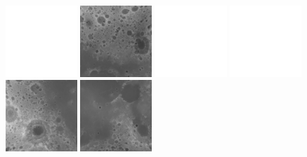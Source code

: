 \documentclass[oneside,10pt]{memoir}
\begin{document}
\begin{Spacing}{1.1}
\begin{figure}
  \centering
  \includegraphics[width=0.24\textwidth]{fig/blank.pdf}
  \includegraphics[width=0.24\textwidth]{fig/dtmh2.png}
  \includegraphics[width=0.24\textwidth]{fig/blank.pdf}
  \includegraphics[width=0.24\textwidth]{fig/blank.pdf}\\\vspace{1pt}
  \includegraphics[width=0.24\textwidth]{fig/dtmh1.png}
  \includegraphics[width=0.24\textwidth]{fig/dtmh4.png}

\end{figure}
\end{Spacing}
\end{document}
